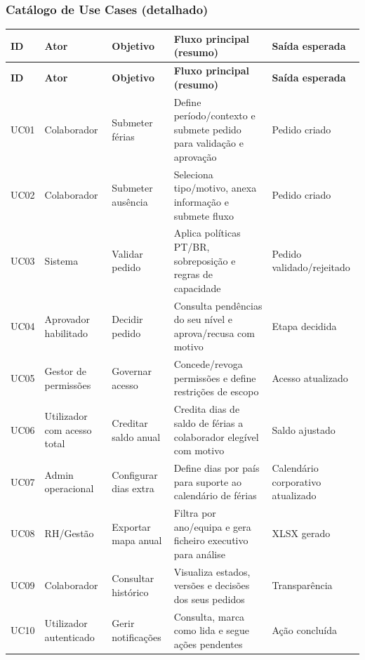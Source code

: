 \documentclass[11pt,a4paper]{article}
\begin{document}
\subsubsection{Catálogo de Use Cases (detalhado)}
\begin{longtable}{p{1.1cm} p{2.7cm} p{4.2cm} p{5.8cm} p{2.3cm}}
\toprule
\textbf{ID} & \textbf{Ator} & \textbf{Objetivo} & \textbf{Fluxo principal (resumo)} & \textbf{Saída esperada} \\
\midrule
\endfirsthead
\toprule
\textbf{ID} & \textbf{Ator} & \textbf{Objetivo} & \textbf{Fluxo principal (resumo)} & \textbf{Saída esperada} \\
\midrule
\endhead
UC01 & Colaborador & Submeter férias & Define período/contexto e submete pedido para validação e aprovação & Pedido criado \\
UC02 & Colaborador & Submeter ausência & Seleciona tipo/motivo, anexa informação e submete fluxo & Pedido criado \\
UC03 & Sistema & Validar pedido & Aplica políticas PT/BR, sobreposição e regras de capacidade & Pedido validado/rejeitado \\
UC04 & Aprovador habilitado & Decidir pedido & Consulta pendências do seu nível e aprova/recusa com motivo & Etapa decidida \\
UC05 & Gestor de permissões & Governar acesso & Concede/revoga permissões e define restrições de escopo & Acesso atualizado \\
UC06 & Utilizador com acesso total & Creditar saldo anual & Credita dias de saldo de férias a colaborador elegível com motivo & Saldo ajustado \\
UC07 & Admin operacional & Configurar dias extra & Define dias por país para suporte ao calendário de férias & Calendário corporativo atualizado \\
UC08 & RH/Gestão & Exportar mapa anual & Filtra por ano/equipa e gera ficheiro executivo para análise & XLSX gerado \\
UC09 & Colaborador & Consultar histórico & Visualiza estados, versões e decisões dos seus pedidos & Transparência \\
UC10 & Utilizador autenticado & Gerir notificações & Consulta, marca como lida e segue ações pendentes & Ação concluída \\
\bottomrule
\end{longtable}
\end{document}
